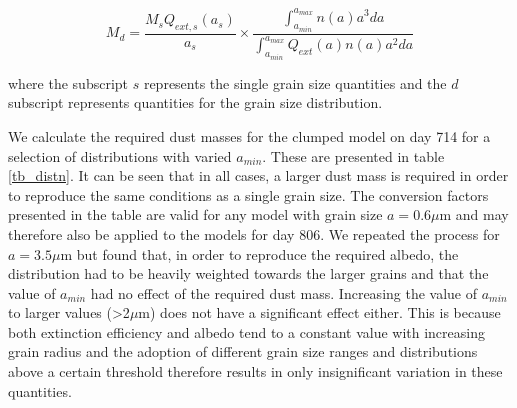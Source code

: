 \documentclass[useAMS,usenatbib,usegraphicx]{mnras}
\begin{document}
\begin{equation}
\label{distn_conv}
M_{d}= \frac{M_s Q_{ext,s}(a_s)}{a_s} \times \frac{\int^{a_{max}}_{a_{min}} n(a) a^3 da}{\int^{a_{max}}_{a_{min}} Q_{ext}(a) n(a) a^2 da}
\end{equation}

where the subscript $s$ represents the single grain size quantities and the $d$ subscript represents quantities for the grain size distribution.  

We calculate the required dust masses for the clumped model on day 714 for a selection of distributions with varied $a_{min}$.  These are presented in table \ref{tb_distn}.  It can be seen that in all cases, a larger dust mass is required in order to reproduce the same conditions as a single grain size.  The conversion factors presented in the table are valid for any model with grain size $a=0.6\mu$m and may therefore also be applied to the models for day 806.  We repeated the process for $a=3.5 \mu$m but found that, in order to reproduce the required albedo, the distribution had to be heavily weighted towards the larger grains and that the value of $a_{min}$ had no effect of the required dust mass.  Increasing the value of $a_{min}$ to larger values (>2$\mu$m) does not have a significant effect either.  This is because both extinction efficiency and albedo tend to a constant value with increasing grain radius and the adoption of different grain size ranges and distributions above a certain threshold therefore results in only insignificant variation in these quantities. 
\end{document}
